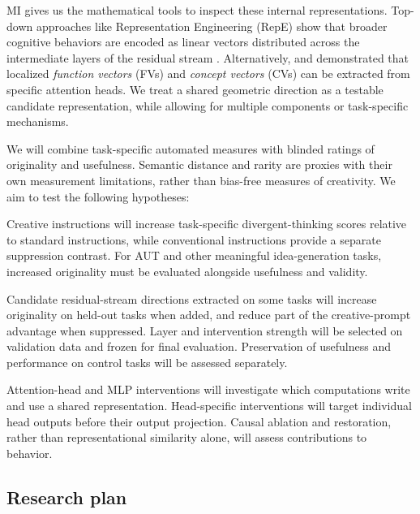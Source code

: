 \documentclass{article}
\begin{document}
MI gives us the mathematical tools to inspect these internal representations. Top-down approaches like Representation Engineering (RepE) show that broader cognitive behaviors are encoded as linear vectors distributed across the intermediate layers of the residual stream \parencite{hernandez2024linearity, zou2023representation}. Alternatively, \textcite{todd2024function} and \textcite{opielka2025analogical} demonstrated that localized \textit{function vectors} (FVs) and \textit{concept vectors} (CVs) can be extracted from specific attention heads. We treat a shared geometric direction as a testable candidate representation, while allowing for multiple components or task-specific mechanisms.

We will combine task-specific automated measures with blinded ratings of originality and usefulness. Semantic distance and rarity are proxies with their own measurement limitations, rather than bias-free measures of creativity. We aim to test the following hypotheses:

\begin{description}[leftmargin=1.5cm, style=nextline]
    \item[Hypothesis 1 (Behavioral Shift):] Creative instructions will increase task-specific divergent-thinking scores relative to standard instructions, while conventional instructions provide a separate suppression contrast. For AUT and other meaningful idea-generation tasks, increased originality must be evaluated alongside usefulness and validity.
    \item[Hypothesis 2 (Shared Causal Representation):] Candidate residual-stream directions extracted on some tasks will increase originality on held-out tasks when added, and reduce part of the creative-prompt advantage when suppressed. Layer and intervention strength will be selected on validation data and frozen for final evaluation. Preservation of usefulness and performance on control tasks will be assessed separately.
    \item[Hypothesis 3 (Mechanistic Localization, Exploratory):] Attention-head and MLP interventions will investigate which computations write and use a shared representation. Head-specific interventions will target individual head outputs before their output projection. Causal ablation and restoration, rather than representational similarity alone, will assess contributions to behavior.
\end{description}

\subsection{Research plan}
\end{document}
